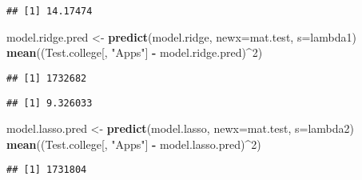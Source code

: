 \documentclass[
]{article}
\newenvironment{Shaded}{\begin{snugshade}}{\end{snugshade}}
\newcommand{\CommentTok}[1]{\textcolor[rgb]{0.56,0.35,0.01}{\textit{#1}}}
\newcommand{\DataTypeTok}[1]{\textcolor[rgb]{0.13,0.29,0.53}{#1}}
\newcommand{\DecValTok}[1]{\textcolor[rgb]{0.00,0.00,0.81}{#1}}
\newcommand{\FloatTok}[1]{\textcolor[rgb]{0.00,0.00,0.81}{#1}}
\newcommand{\KeywordTok}[1]{\textcolor[rgb]{0.13,0.29,0.53}{\textbf{#1}}}
\newcommand{\NormalTok}[1]{#1}
\newcommand{\OperatorTok}[1]{\textcolor[rgb]{0.81,0.36,0.00}{\textbf{#1}}}
\newcommand{\StringTok}[1]{\textcolor[rgb]{0.31,0.60,0.02}{#1}}
\begin{document}
\begin{verbatim}
## [1] 14.17474
\end{verbatim}

\begin{Shaded}
\begin{Highlighting}[]
\NormalTok{model.ridge.pred <-}\StringTok{ }\KeywordTok{predict}\NormalTok{(model.ridge, }\DataTypeTok{newx=}\NormalTok{mat.test, }\DataTypeTok{s=}\NormalTok{lambda1)}
\KeywordTok{mean}\NormalTok{((Test.college[, }\StringTok{"Apps"}\NormalTok{] }\OperatorTok{-}\StringTok{ }\NormalTok{model.ridge.pred)}\OperatorTok{^}\DecValTok{2}\NormalTok{)}
\end{Highlighting}
\end{Shaded}

\begin{verbatim}
## [1] 1732682
\end{verbatim}

\begin{Shaded}
\end{Shaded}

\begin{verbatim}
## [1] 9.326033
\end{verbatim}

\begin{Shaded}
\begin{Highlighting}[]
\NormalTok{model.lasso.pred <-}\StringTok{ }\KeywordTok{predict}\NormalTok{(model.lasso, }\DataTypeTok{newx=}\NormalTok{mat.test, }\DataTypeTok{s=}\NormalTok{lambda2)}
\KeywordTok{mean}\NormalTok{((Test.college[, }\StringTok{"Apps"}\NormalTok{] }\OperatorTok{-}\StringTok{ }\NormalTok{model.lasso.pred)}\OperatorTok{^}\DecValTok{2}\NormalTok{)}
\end{Highlighting}
\end{Shaded}

\begin{verbatim}
## [1] 1731804
\end{verbatim}
\end{document}
